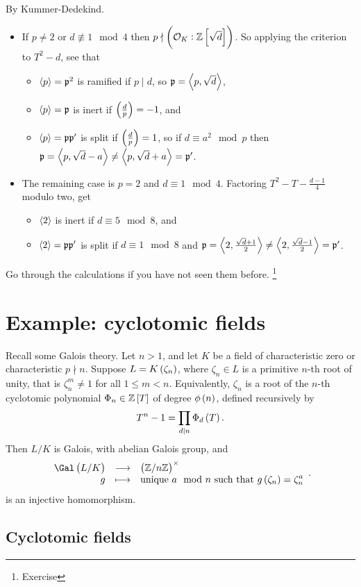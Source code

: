 By Kummer-Dedekind.
\begin{itemize}
\item If $ p \ne 2 $ or $ d \not\equiv 1 \mod 4 $ then $ p \nmid \br{\OOO_K : \ZZ\sbr{\sqrt{d}}} $. So applying the criterion to $ T^2 - d $, see that
\begin{itemize}
\item $ \left\langle p \right\rangle = \mathfrak{p}^2 $ is ramified if $ p \mid d $, so $ \mathfrak{p} = \left\langle p, \sqrt{d} \right\rangle $,
\item $ \left\langle p \right\rangle = \mathfrak{p} $ is inert if $ \br{\tfrac{d}{p}} = -1 $, and
\item $ \left\langle p \right\rangle = \mathfrak{p}\mathfrak{p}' $ is split if $ \br{\tfrac{d}{p}} = 1 $, so if $ d \equiv a^2 \mod p $ then $ \mathfrak{p} = \left\langle p, \sqrt{d} - a \right\rangle \ne \left\langle p, \sqrt{d} + a \right\rangle = \mathfrak{p}' $.
\end{itemize}
\item The remaining case is $ p = 2 $ and $ d \equiv 1 \mod 4 $. Factoring $ T^2 - T - \tfrac{d - 1}{4} $ modulo two, get
\begin{itemize}
\item $ \left\langle 2 \right\rangle $ is inert if $ d \equiv 5 \mod 8 $, and
\item $ \left\langle 2 \right\rangle = \mathfrak{p}\mathfrak{p}' $ is split if $ d \equiv 1 \mod 8 $ and $ \mathfrak{p} = \left\langle 2, \tfrac{\sqrt{d} + 1}{2} \right\rangle \ne \left\langle 2, \tfrac{\sqrt{d} - 1}{2} \right\rangle = \mathfrak{p}' $.
\end{itemize}
\end{itemize}
Go through the calculations if you have not seen them before. \footnote{Exercise}

\pagebreak

\section{Example: cyclotomic fields}

Recall some Galois theory. Let $ n > 1 $, and let $ K $ be a field of characteristic zero or characteristic $ p \nmid n $. Suppose $ L = K\br{\zeta_n} $, where $ \zeta_n \in L $ is a primitive $ n $-th root of unity, that is $ \zeta_n^m \ne 1 $ for all $ 1 \le m < n $. Equivalently, $ \zeta_n $ is a root of the $ n $-th cyclotomic polynomial $ \Phi_n \in \ZZ\sbr{T} $ of degree $ \phi\br{n} $, defined recursively by
$$ T^n - 1 = \prod_{d \mid n} \Phi_d\br{T}. $$
Then $ L / K $ is Galois, with abelian Galois group, and
$$ \function{\Gal\br{L / K}}{\br{\ZZ / n\ZZ}^\times}{g}{\text{unique} \ a \mod n \ \text{such that} \ g\br{\zeta_n} = \zeta_n^a}. $$
is an injective homomorphism.

\subsection{Cyclotomic fields}

